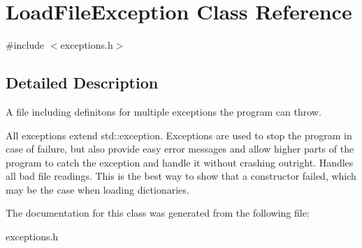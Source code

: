 \hypertarget{classLoadFileException}{
\section{LoadFileException Class Reference}
\label{classLoadFileException}
}


{\ttfamily \#include $<$exceptions.h$>$}



\subsection{Detailed Description}
A file including definitons for multiple exceptions the program can throw.

All exceptions extend std::exception. Exceptions are used to stop the program in case of failure, but also provide easy error messages and allow higher parts of the program to catch the exception and handle it without crashing outright. Handles all bad file readings. This is the best way to show that a constructor failed, which may be the case when loading dictionaries. 

The documentation for this class was generated from the following file:\begin{DoxyCompactItemize}
\item 
exceptions.h\end{DoxyCompactItemize}
